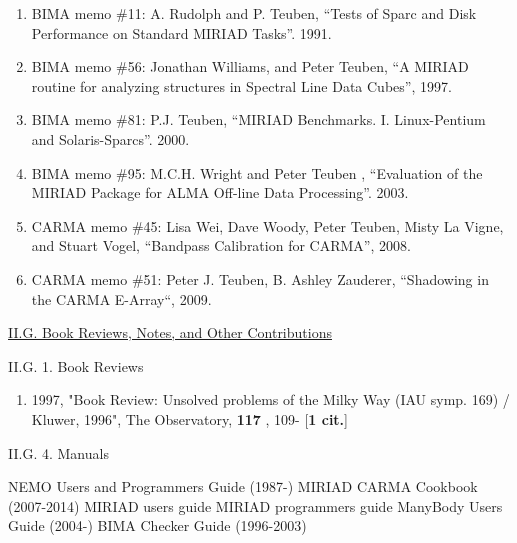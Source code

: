 \documentclass[11pt,letterpaper]{article}
\newcommand{\newi}{\newline\indent}
\begin{document}
\begin{enumerate}[resume,label=\textbf{\arabic*}.]  
\item
BIMA memo \#11: A. Rudolph and P. Teuben,
``Tests of Sparc and Disk Performance on Standard MIRIAD Tasks''. 1991.

\item
BIMA memo \#56: Jonathan Williams, and Peter Teuben,
``A MIRIAD routine for analyzing structures in Spectral Line Data Cubes'', 1997.

\item
BIMA memo \#81: P.J. Teuben,
``MIRIAD Benchmarks. I. Linux-Pentium and Solaris-Sparcs''. 2000.

\item
BIMA memo \#95: M.C.H. Wright and Peter Teuben ,
``Evaluation of the MIRIAD Package for ALMA Off-line Data Processing''. 2003.

\item
CARMA memo \#45:  Lisa Wei, Dave Woody, Peter Teuben, Misty La Vigne, and Stuart Vogel,
``Bandpass Calibration for CARMA'', 2008.

\item
CARMA memo \#51: Peter J. Teuben, B. Ashley Zauderer,
``Shadowing in the CARMA E-Array``, 2009.
\end{enumerate}
               





\underline{II.G. Book Reviews, Notes, and Other Contributions}

II.G. 1. Book Reviews

\begin{enumerate}[resume,label=\textbf{\arabic*}.]

\item  
 1997,  "Book Review: Unsolved problems of the Milky Way (IAU symp. 169) / 
Kluwer, 1996", The Observatory,  {\bf 117} , 109- [{\bf 1 cit.}] 

\end{enumerate}




II.G. 4. Manuals

NEMO Users and Programmers Guide (1987-)\newi
MIRIAD CARMA Cookbook (2007-2014)\newi
MIRIAD users guide\newi
MIRIAD programmers guide\newi
ManyBody Users Guide (2004-)\newi
BIMA Checker Guide (1996-2003)\newi
\end{document}

